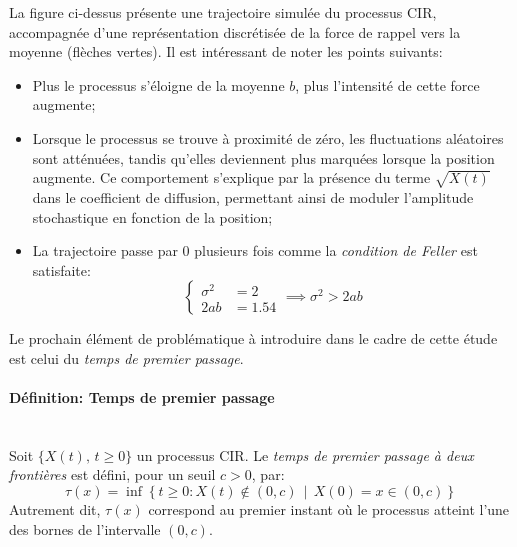 \FloatBarrier La figure ci-dessus présente une trajectoire simulée du processus \acs{CIR}, accompagnée d'une représentation discrétisée de la force de rappel vers la moyenne (flèches vertes). Il est intéressant de noter les points suivants:
\begin{itemize}
    \item  Plus le processus s'éloigne de la moyenne $b$, plus l'intensité de cette force augmente;
    \item Lorsque le processus se trouve à proximité de zéro, les fluctuations aléatoires sont atténuées, tandis qu'elles deviennent plus marquées lorsque la position augmente. Ce comportement s'explique par la présence du terme \(\sqrt{X(t)}\) dans le coefficient de diffusion, permettant ainsi de moduler l'amplitude stochastique en fonction de la position;
    \item La trajectoire passe par 0 plusieurs fois comme la \textit{condition de Feller} est satisfaite:
    \[
    \left\{\begin{aligned}
        \sigma^2&=2\\
        2ab&=1.54
    \end{aligned}\right.\implies\sigma^2 > 2ab
    \]
\end{itemize}
Le prochain élément de problématique à introduire dans le cadre de cette étude est celui du \textit{temps de premier passage}.
\paragraph{Définition: Temps de premier passage}\mbox{}\\
Soit $\{X(t),\, t \geq 0\}$ un processus \acs{CIR}. Le \textit{temps de premier passage à deux frontières} est défini, pour un seuil $c > 0$, par:
\begin{equation}\label{fpt_definition}
    \tau(x) = \inf \left\{ t \geq 0: X(t) \notin (0, c) \,\middle|\, X(0) = x \in (0, c) \right\}
\end{equation}
Autrement dit, $\tau(x)$ correspond au premier instant où le processus atteint l'une des bornes de l'intervalle $(0, c)$. 

